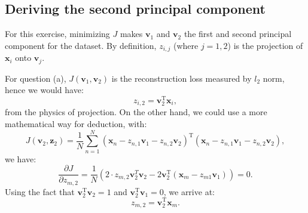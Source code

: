 \documentclass[UTF8]{ctexart}
\begin{document}
\subsection{Deriving the second principal component}
For this exercise, minimizing $J$ makes $\textbf{v}_{1}$ and $\textbf{v}_{2}$ the first and second principal component for the dataset.
By definition, $z_{i,j}$ (where $j=1,2$) is the projection of $\textbf{x}_{i}$ onto $\textbf{v}_{j}$.

For question (a), $J(\textbf{v}_{1},\textbf{v}_{2})$ is the reconstruction loss measured by $l_{2}$ norm, hence we would have:
$$z_{i,2}=\textbf{v}_{2}^{\text{T}}\textbf{x}_{i},$$
from the physics of projection.
On the other hand, we could use a more mathematical way for deduction, with:
$$J(\textbf{v}_{2},\textbf{z}_{2})=\frac{1}{N}\sum_{n=1}^{N}(\textbf{x}_{n}-z_{n,1}\textbf{v}_{1}-z_{n,2}\textbf{v}_{2})^{\text{T}}(\textbf{x}_{n}-z_{n,1}\textbf{v}_{1}-z_{n,2}\textbf{v}_{2}),$$
we have:
$$\frac{\partial J}{\partial z_{m,2}}= \frac{1}{N}(2\cdot z_{m,2}\textbf{v}_{2}^{T}\textbf{v}_{2}-2\textbf{v}_{2}^{\text{T}}(\textbf{x}_{m}-z_{m1}\textbf{v}_{1}))=0.$$
Using the fact that $\textbf{v}_{2}^{\text{T}}\textbf{v}_{2}=1$ and $\textbf{v}_{2}^{\text{T}}\textbf{v}_{1}=0$, we arrive at:
$$z_{m,2}=\textbf{v}_{2}^{\text{T}}\textbf{x}_{m}.$$
\end{document}

